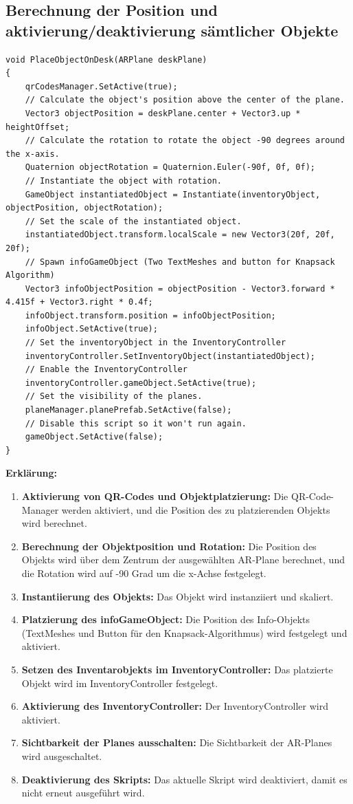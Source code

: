 \subsection*{Berechnung der Position und aktivierung/deaktivierung sämtlicher Objekte}
\begin{lstlisting}[style=csharp, caption={}, label=code:placeobject]
void PlaceObjectOnDesk(ARPlane deskPlane)
{
    qrCodesManager.SetActive(true);
    // Calculate the object's position above the center of the plane.
    Vector3 objectPosition = deskPlane.center + Vector3.up * heightOffset;
    // Calculate the rotation to rotate the object -90 degrees around the x-axis.
    Quaternion objectRotation = Quaternion.Euler(-90f, 0f, 0f);
    // Instantiate the object with rotation.
    GameObject instantiatedObject = Instantiate(inventoryObject, objectPosition, objectRotation);
    // Set the scale of the instantiated object.
    instantiatedObject.transform.localScale = new Vector3(20f, 20f, 20f);
    // Spawn infoGameObject (Two TextMeshes and button for Knapsack Algorithm)
    Vector3 infoObjectPosition = objectPosition - Vector3.forward * 4.415f + Vector3.right * 0.4f;
    infoObject.transform.position = infoObjectPosition;
    infoObject.SetActive(true);
    // Set the inventoryObject in the InventoryController
    inventoryController.SetInventoryObject(instantiatedObject);
    // Enable the InventoryController
    inventoryController.gameObject.SetActive(true);
    // Set the visibility of the planes.
    planeManager.planePrefab.SetActive(false);
    // Disable this script so it won't run again.
    gameObject.SetActive(false);
}
\end{lstlisting}

\textbf{Erklärung:}
\begin{enumerate}
    \item \textbf{Aktivierung von QR-Codes und Objektplatzierung:} Die QR-Code-Manager werden aktiviert, und die Position des zu platzierenden Objekts wird berechnet.
    \item \textbf{Berechnung der Objektposition und Rotation:} Die Position des Objekts wird über dem Zentrum der ausgewählten AR-Plane berechnet, und die Rotation wird auf -90 Grad um die x-Achse festgelegt.
    \item \textbf{Instantiierung des Objekts:} Das Objekt wird instanziiert und skaliert.
    \item \textbf{Platzierung des infoGameObject:} Die Position des Info-Objekts (TextMeshes und Button für den Knapsack-Algorithmus) wird festgelegt und aktiviert.
    \item \textbf{Setzen des Inventarobjekts im InventoryController:} Das platzierte Objekt wird im InventoryController festgelegt.
    \item \textbf{Aktivierung des InventoryController:} Der InventoryController wird aktiviert.
    \item \textbf{Sichtbarkeit der Planes ausschalten:} Die Sichtbarkeit der AR-Planes wird ausgeschaltet.
    \item \textbf{Deaktivierung des Skripts:} Das aktuelle Skript wird deaktiviert, damit es nicht erneut ausgeführt wird.\\
\end{enumerate}

